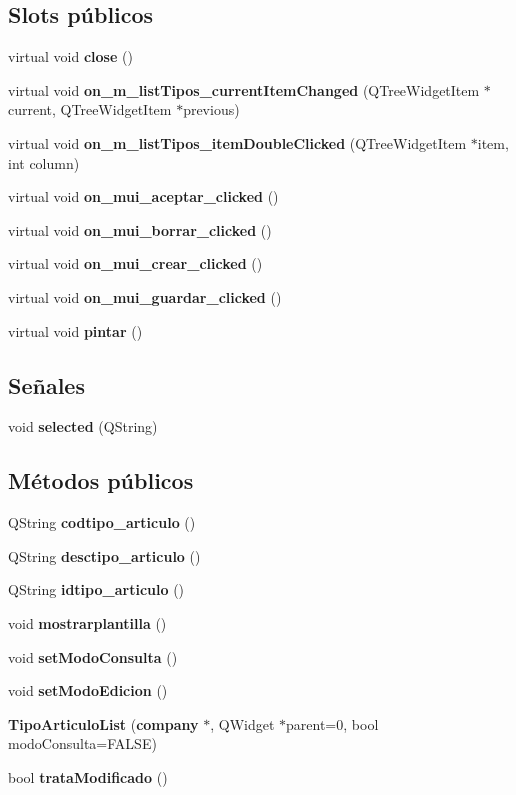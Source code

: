 \subsection*{Slots p\'{u}blicos}
\begin{CompactItemize}
\item 
virtual void {\bf close} ()
\item 
virtual void {\bf on\_\-m\_\-list\-Tipos\_\-current\-Item\-Changed} (QTree\-Widget\-Item $\ast$current, QTree\-Widget\-Item $\ast$previous)
\item 
virtual void {\bf on\_\-m\_\-list\-Tipos\_\-item\-Double\-Clicked} (QTree\-Widget\-Item $\ast$item, int column)
\item 
virtual void {\bf on\_\-mui\_\-aceptar\_\-clicked} ()\label{classTipoArticuloList_i3}

\item 
virtual void {\bf on\_\-mui\_\-borrar\_\-clicked} ()
\item 
virtual void {\bf on\_\-mui\_\-crear\_\-clicked} ()
\item 
virtual void {\bf on\_\-mui\_\-guardar\_\-clicked} ()
\item 
virtual void {\bf pintar} ()
\end{CompactItemize}
\subsection*{Se\~{n}ales}
\begin{CompactItemize}
\item 
void {\bf selected} (QString)\label{classTipoArticuloList_l0}

\end{CompactItemize}
\subsection*{M\'{e}todos p\'{u}blicos}
\begin{CompactItemize}
\item 
QString {\bf codtipo\_\-articulo} ()\label{classTipoArticuloList_a0}

\item 
QString {\bf desctipo\_\-articulo} ()\label{classTipoArticuloList_a1}

\item 
QString {\bf idtipo\_\-articulo} ()\label{classTipoArticuloList_a2}

\item 
void {\bf mostrarplantilla} ()
\item 
void {\bf set\-Modo\-Consulta} ()\label{classTipoArticuloList_a4}

\item 
void {\bf set\-Modo\-Edicion} ()\label{classTipoArticuloList_a5}

\item 
{\bf Tipo\-Articulo\-List} ({\bf company} $\ast$, QWidget $\ast$parent=0, bool modo\-Consulta=FALSE)\label{classTipoArticuloList_a6}

\item 
bool {\bf trata\-Modificado} ()
\end{CompactItemize}



